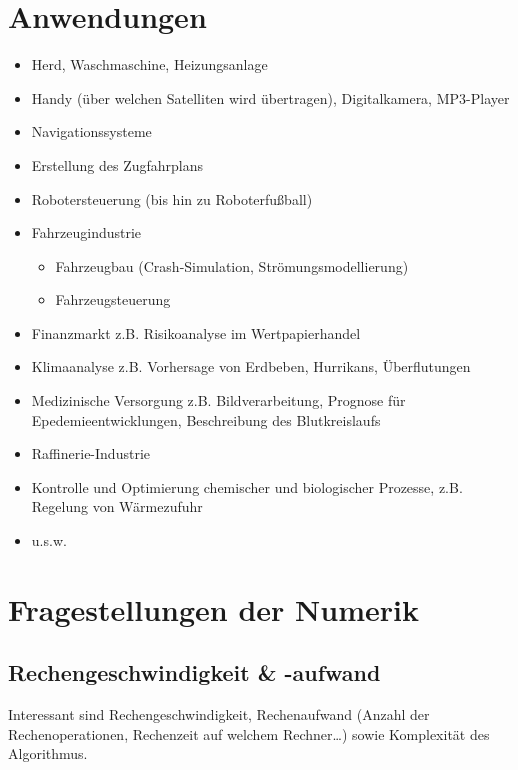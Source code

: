 \documentclass[ngerman,fontsize=11pt, paper=a4, parskip=half, titlepage=true, toc=bib]{scrbook}
\theoremstyle{definition}
\theoremstyle{plain}
\begin{document}
\section*{Anwendungen}
\begin{itemize}
\item Herd, Waschmaschine, Heizungsanlage
\item Handy (über welchen Satelliten wird übertragen),
  Digitalkamera, MP3-Player
\item Navigationssysteme
\item Erstellung des Zugfahrplans
\item Robotersteuerung (bis hin zu Roboterfußball)
\item Fahrzeugindustrie
  \begin{itemize}
  \item Fahrzeugbau (Crash-Simulation,
    Strömungsmodellierung)
  \item Fahrzeugsteuerung
  \end{itemize}
\item Finanzmarkt z.B. Risikoanalyse im Wertpapierhandel
\item Klimaanalyse z.B. Vorhersage von Erdbeben, Hurrikans,
  Überflutungen
\item Medizinische Versorgung z.B. Bildverarbeitung, Prognose
  für Epedemieentwicklungen, Beschreibung des Blutkreislaufs
\item Raffinerie-Industrie
\item Kontrolle und Optimierung chemischer und biologischer
  Prozesse, z.B. Regelung von Wärmezufuhr
\item u.s.w.
\end{itemize}

\section*{Fragestellungen der Numerik}
\subsection*{Rechengeschwindigkeit \& -aufwand}
Interessant sind Rechengeschwindigkeit, Rechenaufwand 
(Anzahl der Rechenoperationen, Rechenzeit auf welchem Rechner…)
sowie Komplexität des Algorithmus.
\end{document}
